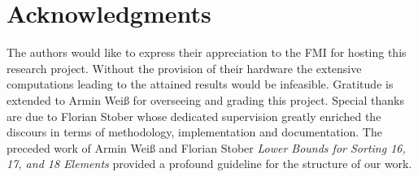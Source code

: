 \documentclass[10pt,journal,compsoc]{IEEEtran}
\begin{document}
\section*{Acknowledgments}

The authors would like to express their appreciation to the FMI for hosting this research project.
Without the provision of their hardware the extensive computations leading to the attained results would be infeasible.
Gratitude is extended to Armin Weiß for overseeing and grading this project.
Special thanks are due to Florian Stober whose dedicated supervision greatly enriched the discours in terms of methodology, implementation and documentation.
The preceded work of Armin Weiß and Florian Stober \textit{Lower Bounds for Sorting 16, 17, and 18 Elements} \cite{stober2022lower} provided a profound guideline for the structure of our work.

\ifCLASSOPTIONcaptionsoff
  \newpage
\fi




\end{document}
